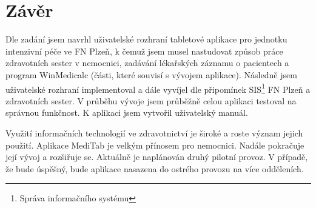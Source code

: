 \setlength{\parskip}{1em}

\chapter*{Závěr}

Dle zadání jsem navrhl uživatelské rozhraní tabletové aplikace pro jednotku intenzivní péče ve FN Plzeň, k čemuž jsem musel nastudovat způsob práce zdravotních sester v nemocnici, zadávání lékařských záznamu o pacientech a program WinMedicalc (části, které souvisí s vývojem aplikace). Následně jsem uživatelské rozhraní implementoval a dále vyvíjel dle připomínek SIS\footnote{Správa informačního systému} FN Plzeň a zdravotních sester. V průběhu vývoje jsem průběžně celou aplikaci testoval na správnou funkčnost. K aplikaci jsem vytvořil uživatelský manuál.

Využití informačních technologií ve zdravotnictví je široké a roste význam jejich použití. Aplikace MediTab je velkým přínosem pro nemocnici. Nadále pokračuje její vývoj a rozšiřuje se. Aktuálně je naplánován druhý pilotní provoz. V případě, že bude úspěšný, bude aplikace nasazena do ostrého provozu na více odděleních.